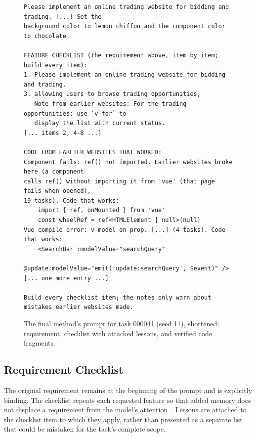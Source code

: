 \begin{figure}[ht]
\begin{lstlisting}[basicstyle=\ttfamily\scriptsize]
Please implement an online trading website for bidding and trading. [...] Set the
background color to lemon chiffon and the component color to chocolate.

FEATURE CHECKLIST (the requirement above, item by item; build every item):
1. Please implement an online trading website for bidding and trading.
3. allowing users to browse trading opportunities,
   Note from earlier websites: For the trading opportunities: use `v-for` to
   display the list with current status.
[... items 2, 4-8 ...]

CODE FROM EARLIER WEBSITES THAT WORKED:
Component fails: ref() not imported. Earlier websites broke here (a component
calls ref() without importing it from 'vue' (that page fails when opened),
19 tasks). Code that works:
    import { ref, onMounted } from 'vue'
    const wheelRef = ref<HTMLElement | null>(null)
Vue compile error: v-model on prop. [...] (4 tasks). Code that works:
    <SearchBar :modelValue="searchQuery"
               @update:modelValue="emit('update:searchQuery', $event)" />
[... one more entry ...]

Build every checklist item; the notes only warn about mistakes earlier websites made.
\end{lstlisting}
\caption{The final method's prompt for task 000041 (seed 11), shortened: requirement, checklist with attached lessons, and verified code fragments.}
\label{fig:prompt}
\end{figure}

\subsection{Requirement Checklist}
\label{sec:checklist}
The original requirement remains at the beginning of the prompt and is explicitly binding. The checklist repeats each requested feature so that added memory does not displace a requirement from the model's attention~\cite{liu2024lost,wallace2024hierarchy}. Lessons are attached to the checklist item to which they apply, rather than presented as a separate list that could be mistaken for the task's complete scope.

